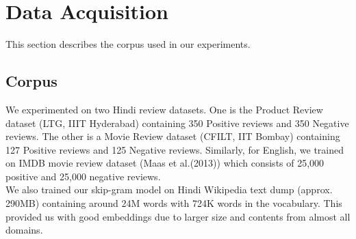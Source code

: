 \chapter{Data Acquisition}
	This section describes the corpus used in our experiments.
	
	\section{Corpus}
	\label{corpus}
	We experimented on two Hindi review datasets. One is the Product Review dataset (LTG, IIIT Hyderabad) containing 350 Positive reviews and 350 Negative reviews. The other is a Movie Review dataset (CFILT, IIT Bombay) containing 127 Positive reviews and 125 Negative reviews. Similarly, for English, we trained on IMDB movie review dataset (Maas et al.(2013)) which consists of 25,000 positive and 25,000 negative reviews.\\
	We also trained our skip-gram model on Hindi Wikipedia text dump (approx. 290MB) containing around 24M words with 724K words in the vocabulary. This provided us with good embeddings due to larger size and contents from almost all domains.

